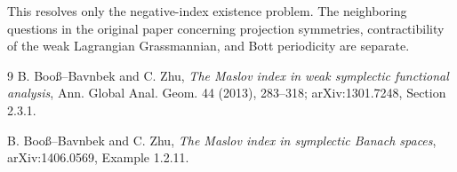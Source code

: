 \documentclass[11pt]{article}
\begin{document}
This resolves only the negative-index existence problem.  The neighboring
questions in the original paper concerning projection symmetries,
contractibility of the weak Lagrangian Grassmannian, and Bott periodicity are
separate.

\begin{thebibliography}{9}
B. Boo\ss--Bavnbek and C. Zhu,
\emph{The Maslov index in weak symplectic functional analysis},
Ann. Global Anal. Geom. 44 (2013), 283--318;
arXiv:1301.7248, Section 2.3.1.

B. Boo\ss--Bavnbek and C. Zhu,
\emph{The Maslov index in symplectic Banach spaces},
arXiv:1406.0569, Example 1.2.11.
\end{thebibliography}
\end{document}

